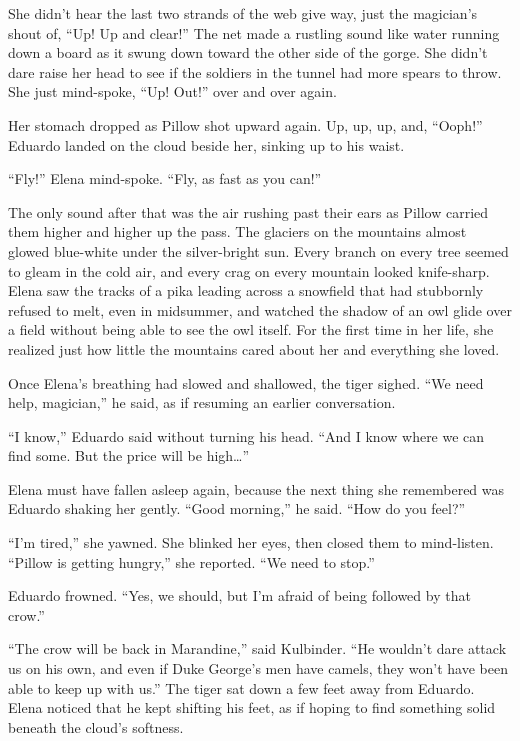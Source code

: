 \documentclass[10pt]{book}
\begin{document}
She didn't hear the last two strands of the web give way, just the magician's shout of, ``Up!  Up and clear!''  The net made a rustling sound like water running down a board as it swung down toward the other side of the gorge.  She didn't dare raise her head to see if the soldiers in the tunnel had more spears to throw.  She just mind-spoke, ``Up! Out!'' over and over again.

Her stomach dropped as Pillow shot upward again.  Up, up, up, and, ``Ooph!''  Eduardo landed on the cloud beside her, sinking up to his waist.

``Fly!'' Elena mind-spoke. ``Fly, as fast as you can!''

The only sound after that was the air rushing past their ears as Pillow carried them higher and higher up the pass. The glaciers on the mountains almost glowed blue-white under the silver-bright sun. Every branch on every tree seemed to gleam in the cold air, and every crag on every mountain looked knife-sharp. Elena saw the tracks of a pika leading across a snowfield that had stubbornly refused to melt, even in midsummer, and watched the shadow of an owl glide over a field without being able to see the owl itself. For the first time in her life, she realized just how little the mountains cared about her and everything she loved.

Once Elena's breathing had slowed and shallowed, the tiger sighed. ``We need help, magician,'' he said, as if resuming an earlier conversation.

``I know,'' Eduardo said without turning his head. ``And I know where we can find some. But the price will be high{\ldots}''

Elena must have fallen asleep again, because the next thing she remembered was Eduardo shaking her gently. ``Good morning,'' he said. ``How do you feel?''

``I'm tired,'' she yawned. She blinked her eyes, then closed them to mind-listen. ``Pillow is getting hungry,'' she reported. ``We need to stop.''

Eduardo frowned. ``Yes, we should, but I'm afraid of being followed by that crow.''

``The crow will be back in Marandine,'' said Kulbinder. ``He wouldn't dare attack us on his own, and even if Duke George's men have camels, they won't have been able to keep up with us.'' The tiger sat down a few feet away from Eduardo. Elena noticed that he kept shifting his feet, as if hoping to find something solid beneath the cloud's softness.
\end{document}
